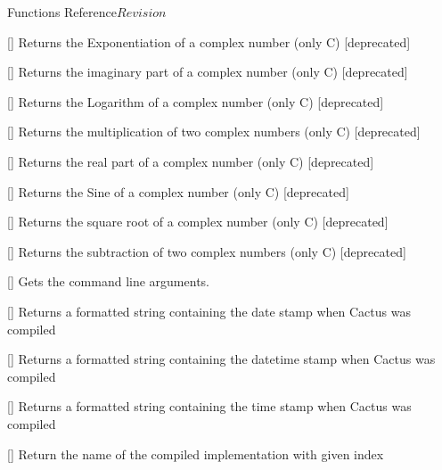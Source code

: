 \begin{cactuspart}{ Functions Reference}{}{$Revision$}
\begin{Lentry}
\item[\code{CCTK\_CmplxExp}] [\pageref{CCTK-CmplxExp}]
  Returns the Exponentiation of a complex number (only C) [deprecated]

\item[\code{CCTK\_CmplxImag}] [\pageref{CCTK-CmplxImag}]
  Returns the imaginary part of a complex number (only C) [deprecated]

\item[\code{CCTK\_CmplxLog}] [\pageref{CCTK-CmplxLog}]
  Returns the Logarithm of a complex number (only C) [deprecated]

\item[\code{CCTK\_CmplxMul}] [\pageref{CCTK-CmplxMul}]
  Returns the multiplication of two complex numbers (only C) [deprecated]

\item[\code{CCTK\_CmplxReal}] [\pageref{CCTK-CmplxReal}]
  Returns the real part of a complex number (only C) [deprecated]

\item[\code{CCTK\_CmplxSin}] [\pageref{CCTK-CmplxSin}]
  Returns the Sine of a complex number (only C) [deprecated]

\item[\code{CCTK\_CmplxSqrt}] [\pageref{CCTK-CmplxSqrt}]
  Returns the square root of a complex number (only C) [deprecated]

\item[\code{CCTK\_CmplxSub}] [\pageref{CCTK-CmplxSub}]
  Returns the subtraction of two complex numbers (only C) [deprecated]

\item[\code{CCTK\_CommandLine}] [\pageref{CCTK-CommandLine}]
 Gets the command line arguments.

\item[\code{CCTK\_CompileDate}] [\pageref{CCTK-CompileDate}]
  Returns a formatted string containing the date stamp when Cactus was compiled

\item[\code{CCTK\_CompileDateTime}] [\pageref{CCTK-CompileDateTime}]
  Returns a formatted string containing the datetime stamp when Cactus was compiled

\item[\code{CCTK\_CompileTime}] [\pageref{CCTK-CompileTime}]
  Returns a formatted string containing the time stamp when Cactus was compiled

\item[\code{CCTK\_CompiledImplementation}]
  [\pageref{CCTK-CompiledImplementation}]
  Return the name of the compiled implementation with given index


\end{Lentry}
\end{cactuspart}
